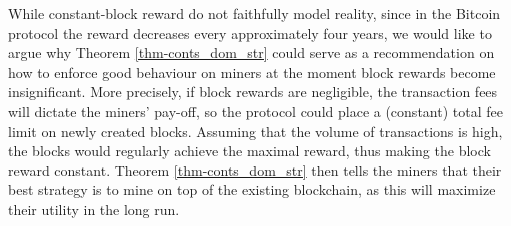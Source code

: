 While constant-block reward do not faithfully model reality, since in the Bitcoin protocol the reward decreases every approximately four years, we would like to argue why Theorem \ref{thm-conts_dom_str} could serve as a recommendation on how to enforce good behaviour on miners at the moment block rewards become insignificant. More precisely, if block rewards are negligible, the transaction fees will dictate the miners' pay-off, so the protocol could place a (constant) total fee limit on newly created blocks.  Assuming that the volume of transactions is high, the blocks would regularly achieve the maximal reward, thus making the block reward constant. Theorem  \ref{thm-conts_dom_str} then tells the miners that their best strategy is to mine on top of the existing blockchain, as this will maximize their utility in the long run.

